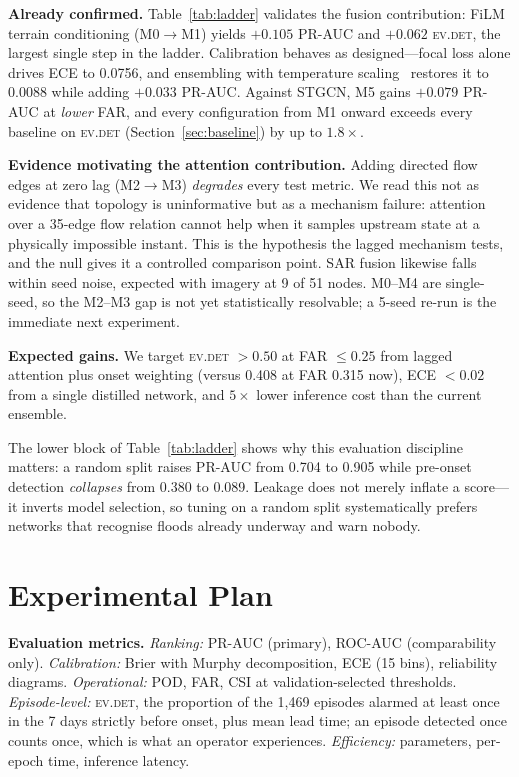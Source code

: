 \documentclass[sigconf]{acmart}
\begin{document}
\textbf{Already confirmed.} Table~\ref{tab:ladder} validates the fusion contribution: FiLM terrain conditioning (M0$\to$M1) yields $+0.105$ PR-AUC and $+0.062$ \textsc{ev.det}, the largest single step in the ladder. Calibration behaves as designed---focal loss alone drives ECE to 0.0756, and ensembling with temperature scaling~\cite{Guo2017} restores it to 0.0088 while adding $+0.033$ PR-AUC. Against STGCN, M5 gains $+0.079$ PR-AUC at \emph{lower} FAR, and every configuration from M1 onward exceeds every baseline on \textsc{ev.det} (Section~\ref{sec:baseline}) by up to $1.8\times$.

\textbf{Evidence motivating the attention contribution.} Adding directed flow edges at zero lag (M2$\to$M3) \emph{degrades} every test metric. We read this not as evidence that topology is uninformative but as a mechanism failure: attention over a 35-edge flow relation cannot help when it samples upstream state at a physically impossible instant. This is the hypothesis the lagged mechanism tests, and the null gives it a controlled comparison point. SAR fusion likewise falls within seed noise, expected with imagery at 9 of 51 nodes. M0--M4 are single-seed, so the M2--M3 gap is not yet statistically resolvable; a 5-seed re-run is the immediate next experiment.

\textbf{Expected gains.} We target \textsc{ev.det} $>0.50$ at FAR $\le 0.25$ from lagged attention plus onset weighting (versus 0.408 at FAR 0.315 now), ECE $<0.02$ from a single distilled network, and $5\times$ lower inference cost than the current ensemble.

The lower block of Table~\ref{tab:ladder} shows why this evaluation discipline matters: a random split raises PR-AUC from 0.704 to 0.905 while pre-onset detection \emph{collapses} from 0.380 to 0.089. Leakage does not merely inflate a score---it inverts model selection, so tuning on a random split systematically prefers networks that recognise floods already underway and warn nobody.

\section{Experimental Plan}

\textbf{Evaluation metrics.} \emph{Ranking:} PR-AUC (primary), ROC-AUC (comparability only). \emph{Calibration:} Brier with Murphy decomposition, ECE (15 bins), reliability diagrams. \emph{Operational:} POD, FAR, CSI at validation-selected thresholds. \emph{Episode-level:} \textsc{ev.det}, the proportion of the 1,469 episodes alarmed at least once in the 7 days strictly before onset, plus mean lead time; an episode detected once counts once, which is what an operator experiences. \emph{Efficiency:} parameters, per-epoch time, inference latency.
\end{document}
